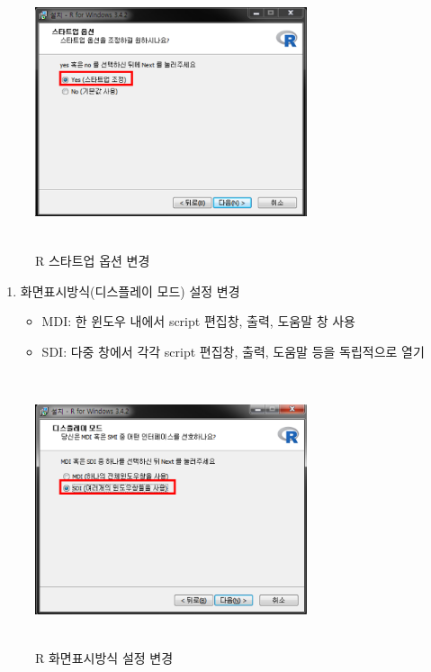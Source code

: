 \documentclass[11pt,a4paper]{book}
\providecommand{\tightlist}{%
  \setlength{\itemsep}{0pt}\setlength{\parskip}{0pt}}
\theoremstyle{definition}
\theoremstyle{definition}
\theoremstyle{definition}
\theoremstyle{remark}
\begin{document}
\begin{figure}[H]
{
  \centering
  \includegraphics[width = 8cm, height = 8cm]{Figures/R-install-F05.png}
  \caption[R 스타트업 옵션 변경]{R 스타트업 옵션 변경}\label{fig:R-install-10}
}
\end{figure}

\begin{enumerate}
\def\labelenumi{\arabic{enumi}.}
\setcounter{enumi}{11}
\tightlist
\item
  화면표시방식(디스플레이 모드) 설정 변경

  \begin{itemize}
  \tightlist
  \item
    MDI: 한 윈도우 내에서 script 편집창, 출력, 도움말 창 사용
  \item
    SDI: 다중 창에서 각각 script 편집창, 출력, 도움말 등을 독립적으로
    열기
  \end{itemize}
\end{enumerate}

\begin{figure}[H]
{
  \centering
  \includegraphics[width = 8cm, height = 8cm]{Figures/R-install-F06.png}
  \caption[R 화면표시방식 설정 변경]{R 화면표시방식 설정 변경}\label{fig:R-install-11}
}
\end{figure}
\end{document}
